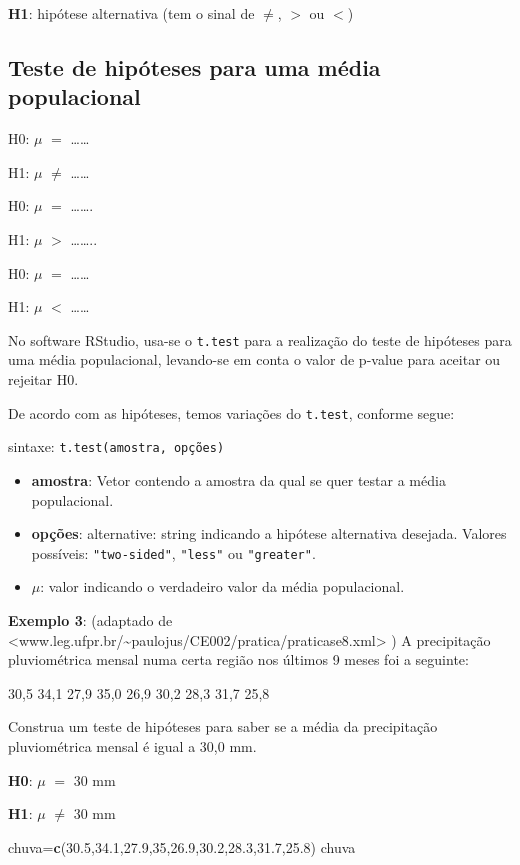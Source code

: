\documentclass[12pt,portuguese,oneside]{book}
\newenvironment{Shaded}{\begin{snugshade}}{\end{snugshade}}
\newcommand{\KeywordTok}[1]{\textcolor[rgb]{0.13,0.29,0.53}{\textbf{#1}}}
\newcommand{\DecValTok}[1]{\textcolor[rgb]{0.00,0.00,0.81}{#1}}
\newcommand{\FloatTok}[1]{\textcolor[rgb]{0.00,0.00,0.81}{#1}}
\newcommand{\NormalTok}[1]{#1}
\providecommand{\tightlist}{%
  \setlength{\itemsep}{0pt}\setlength{\parskip}{0pt}}
\begin{document}
\textbf{H1}: hipótese alternativa (tem o sinal de \(\neq\), \(>\) ou
\(<\))

\subsection{Teste de hipóteses para uma média
populacional}\label{teste-de-hipoteses-para-uma-media-populacional}

H0: \(\mu\) \(=\) \ldots{}\ldots{}

H1: \(\mu\) \(\neq\) \ldots{}\ldots{}

H0: \(\mu\) \(=\) \ldots{}\ldots{}.

H1: \(\mu\) \(>\) \ldots{}\ldots{}..

H0: \(\mu\) \(=\) \ldots{}\ldots{}

H1: \(\mu\) \(<\) \ldots{}\ldots{}

No software RStudio, usa-se o \texttt{t.test} para a realização do teste
de hipóteses para uma média populacional, levando-se em conta o valor de
p-value para aceitar ou rejeitar H0.

De acordo com as hipóteses, temos variações do \texttt{t.test}, conforme
segue:

sintaxe: \texttt{t.test(amostra,\ opções)}

\begin{itemize}
\tightlist
\item
  \textbf{amostra}: Vetor contendo a amostra da qual se quer testar a
  média populacional.
\item
  \textbf{opções}: alternative: string indicando a hipótese alternativa
  desejada. Valores possíveis: \texttt{"two-sided"}, \texttt{"less"} ou
  \texttt{"greater"}.
\item
  \(\mu\): valor indicando o verdadeiro valor da média populacional.
\end{itemize}

\textbf{Exemplo 3}: (adaptado de
\textless{}www.leg.ufpr.br/\textasciitilde{}paulojus/CE002/pratica/praticase8.xml\textgreater{}
) A precipitação pluviométrica mensal numa certa região nos últimos 9
meses foi a seguinte:

30,5 34,1 27,9 35,0 26,9 30,2 28,3 31,7 25,8

Construa um teste de hipóteses para saber se a média da precipitação
pluviométrica mensal é igual a 30,0 mm.

\textbf{H0}: \(\mu\) \(=\) 30 mm

\textbf{H1}: \(\mu\) \(\neq\) 30 mm

\begin{Shaded}
\begin{Highlighting}[]
\NormalTok{chuva=}\KeywordTok{c}\NormalTok{(}\FloatTok{30.5}\NormalTok{,}\FloatTok{34.1}\NormalTok{,}\FloatTok{27.9}\NormalTok{,}\DecValTok{35}\NormalTok{,}\FloatTok{26.9}\NormalTok{,}\FloatTok{30.2}\NormalTok{,}\FloatTok{28.3}\NormalTok{,}\FloatTok{31.7}\NormalTok{,}\FloatTok{25.8}\NormalTok{)}
\NormalTok{chuva}
\end{Highlighting}
\end{Shaded}
\end{document}
